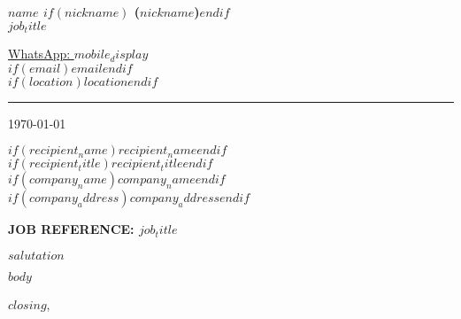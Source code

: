 \documentclass[11pt,a4paper]{article}
\begin{document}
\thispagestyle{empty}
\BgThispage

\begin{minipage}[t]{0.5\textwidth}
	{\Large\textbf{$name$ $if(nickname)$ ($nickname$)$endif$}}\\
	{\color{accentblue}\large $job_title$}
\end{minipage}
\begin{minipage}[t]{0.5\textwidth}
	\begin{flushright}
		\href{https://wa.me/$country_code$$mobile_raw$}{WhatsApp: $mobile_display$}\\
		$if(email)$\href{mailto:$email$}{$email$}$endif$\\
		$if(location)$$location$$endif$
	\end{flushright}
\end{minipage}

\noindent\rule{\textwidth}{0.5pt}

\begin{flushright}
	\today
\end{flushright}

\begin{flushleft}
	$if(recipient_name)$$recipient_name$$endif$\\
	$if(recipient_title)$$recipient_title$$endif$\\
	$if(company_name)$$company_name$$endif$\\
	$if(company_address)$$company_address$$endif$
\end{flushleft}

\vspace{0.5cm}

\begin{center}
	\textbf{\MakeUppercase{Job Reference: $job_title$}}
\end{center}

\vspace{0.3cm}

\begin{flushleft}
	$salutation$
\end{flushleft}

\begin{spacing}{1.15}
	$body$
\end{spacing}

\vspace{0.4cm}
\begin{flushleft}
	$closing$,\\
	\vspace{0.1cm}
\end{flushleft}
\end{document}
